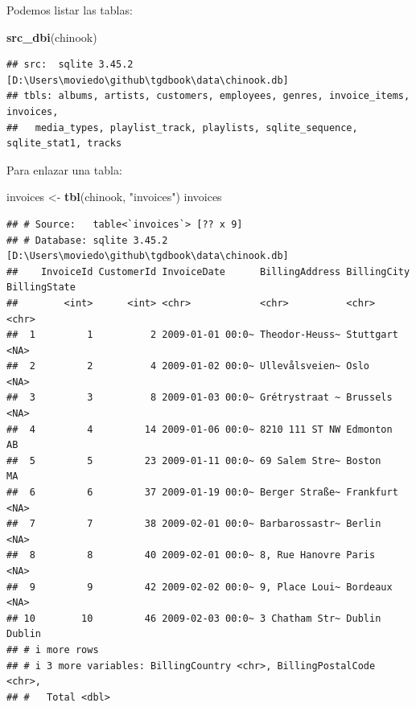 \documentclass[
]{book}
\newenvironment{Shaded}{\begin{snugshade}}{\end{snugshade}}
\newcommand{\FunctionTok}[1]{\textcolor[rgb]{0.13,0.29,0.53}{\textbf{#1}}}
\newcommand{\NormalTok}[1]{#1}
\newcommand{\OtherTok}[1]{\textcolor[rgb]{0.56,0.35,0.01}{#1}}
\newcommand{\StringTok}[1]{\textcolor[rgb]{0.31,0.60,0.02}{#1}}
\begin{document}
Podemos listar las tablas:

\begin{Shaded}
\begin{Highlighting}[]
\FunctionTok{src\_dbi}\NormalTok{(chinook)}
\end{Highlighting}
\end{Shaded}

\begin{verbatim}
## src:  sqlite 3.45.2 [D:\Users\moviedo\github\tgdbook\data\chinook.db]
## tbls: albums, artists, customers, employees, genres, invoice_items, invoices,
##   media_types, playlist_track, playlists, sqlite_sequence, sqlite_stat1, tracks
\end{verbatim}

Para enlazar una tabla:

\begin{Shaded}
\begin{Highlighting}[]
\NormalTok{invoices }\OtherTok{\textless{}{-}} \FunctionTok{tbl}\NormalTok{(chinook, }\StringTok{"invoices"}\NormalTok{)}
\NormalTok{invoices}
\end{Highlighting}
\end{Shaded}

\begin{verbatim}
## # Source:   table<`invoices`> [?? x 9]
## # Database: sqlite 3.45.2 [D:\Users\moviedo\github\tgdbook\data\chinook.db]
##    InvoiceId CustomerId InvoiceDate      BillingAddress BillingCity BillingState
##        <int>      <int> <chr>            <chr>          <chr>       <chr>       
##  1         1          2 2009-01-01 00:0~ Theodor-Heuss~ Stuttgart   <NA>        
##  2         2          4 2009-01-02 00:0~ Ullevålsveien~ Oslo        <NA>        
##  3         3          8 2009-01-03 00:0~ Grétrystraat ~ Brussels    <NA>        
##  4         4         14 2009-01-06 00:0~ 8210 111 ST NW Edmonton    AB          
##  5         5         23 2009-01-11 00:0~ 69 Salem Stre~ Boston      MA          
##  6         6         37 2009-01-19 00:0~ Berger Straße~ Frankfurt   <NA>        
##  7         7         38 2009-02-01 00:0~ Barbarossastr~ Berlin      <NA>        
##  8         8         40 2009-02-01 00:0~ 8, Rue Hanovre Paris       <NA>        
##  9         9         42 2009-02-02 00:0~ 9, Place Loui~ Bordeaux    <NA>        
## 10        10         46 2009-02-03 00:0~ 3 Chatham Str~ Dublin      Dublin      
## # i more rows
## # i 3 more variables: BillingCountry <chr>, BillingPostalCode <chr>,
## #   Total <dbl>
\end{verbatim}
\end{document}
